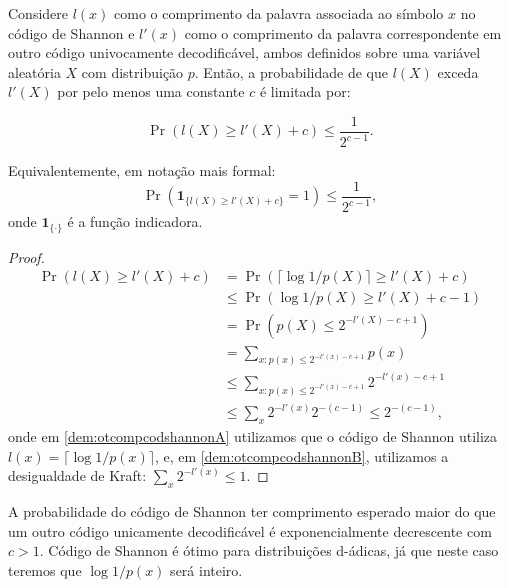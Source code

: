 \begin{theorem}\label{thm:otcompcodshannon}
Considere $l(x)$ como o comprimento da palavra associada ao símbolo $x$ no
código de Shannon e $l'(x)$ como o comprimento da palavra correspondente em
outro código univocamente decodificável, ambos definidos sobre uma variável
aleatória $X$ com distribuição $p$. Então, a probabilidade de que
$l(X)$ exceda $l'(X)$ por pelo menos uma constante $c$ é limitada por:

\begin{equation}
\Pr \left( l(X) \geq l'(X) + c \right) \leq \frac{1}{2^{c-1}} .
\end{equation}

Equivalentemente, em notação mais formal:
\begin{equation}
\Pr \left( \mathbf{1}_{\{ l(X) \geq l'(X) + c \}} = 1 \right) \leq \frac{1}{2^{c-1}},
\end{equation}
onde $\mathbf{1}_{\{ \cdot \}}$ é a função indicadora.
\end{theorem}

\begin{proof}
    \begin{subequations}
      \begin{align}
        \Pr \left( l(X) \geq l'(X) + c \right) &= \Pr \left( \lceil \log 1/p(X) \rceil \geq l'(X) + c \right) \\
                                               &\leq \Pr \left( \log 1/p(X) \geq l'(X) + c - 1  \right) \label{dem:otcompcodshannonA}\\
              &= \Pr \left( p(X) \leq 2^{-l'(X)-c+1} \right) \\
              &=  \sum_{x:p(x) \leq 2^{-l'(x)-c+1}} p(x) \\
              &\leq \sum_{x:p(x) \leq 2^{-l'(x)-c+1}}  2^{-l'(x)-c+1} \\
              &\leq \sum_{x} 2^{-l'(x)} 2^{-(c-1)} \leq 2^{-(c-1)} \label{dem:otcompcodshannonB},
      \end{align}
    \end{subequations}
    onde em \ref{dem:otcompcodshannonA} utilizamos que o código de Shannon utiliza $l(x) = \lceil \log 1/p(x) \rceil$, e,
    em \ref{dem:otcompcodshannonB}, utilizamos a desigualdade de Kraft: $\sum_{x} 2^{-l'(x)} \leq 1$.
\end{proof}

A probabilidade do código de Shannon ter comprimento esperado maior do que um outro
código unicamente decodificável é exponencialmente decrescente com $c > 1$.
Código de Shannon é ótimo para distribuições d-ádicas, já que neste caso teremos que $\log 1/p(x)$ será inteiro.


